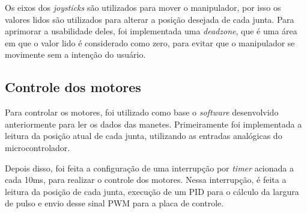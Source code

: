 Os eixos dos \textit{joysticks} são utilizados para mover o manipulador, por isso os valores lidos são utilizados para alterar a posição desejada de cada junta.
Para aprimorar a usabilidade deles, foi implementada uma \textit{deadzone}, que é uma área em que o valor lido é considerado como zero, para evitar que o manipulador se movimente sem a intenção do usuário.

\subsection[Controle dos motores]{Controle dos motores}

Para controlar os motores, foi utilizado como base o \textit{software} desenvolvido anteriormente para ler os dados das manetes.
Primeiramente foi implementada a leitura da posição atual de cada junta, utilizando as entradas analógicas do microcontrolador.

Depois disso, foi feita a configuração de uma interrupção por \textit{timer} acionada a cada 10ms, para realizar o controle dos motores.
Nessa interrupção, é feita a leitura da posição de cada junta, execução de um PID para o cálculo da largura de pulso e envio desse sinal PWM para a placa de controle.